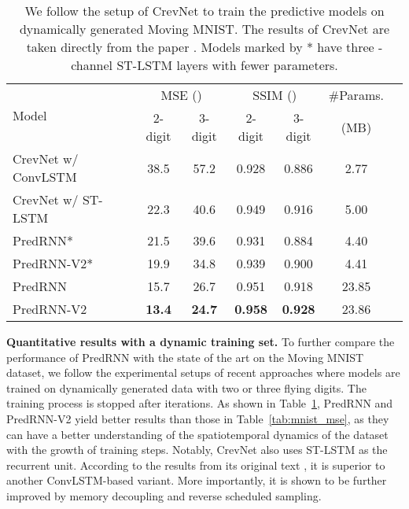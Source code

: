 \documentclass[10pt,journal,compsoc]{IEEEtran}
\newcommand{\tab}[1]{Table~\ref{#1}}
\newcommand{\myparagraph}[1]{\vspace{5pt} \noindent \textbf{#1.}}
\begin{document}
\begin{table}[t]
\vskip 0.05in
  \caption{We follow the setup of CrevNet to train the predictive models on dynamically generated Moving MNIST. The results of CrevNet are taken directly from the paper \cite{yu2020efficient}. Models marked by * have three -channel ST-LSTM layers with fewer parameters.
  }
  \vskip -0.05in
  \setlength{\tabcolsep}{4pt}
  \label{tab:mnist_fly}
  \centering
  \begin{tabular}{lcccccc}
    \toprule
    \multirow{2}{*}{Model} & \multicolumn{2}{c}{MSE ()} & \multicolumn{2}{c}{SSIM ()} & \#Params. \\
    & 2-digit & 3-digit & 2-digit & 3-digit & (MB) \\
    \midrule
    CrevNet w/ ConvLSTM & 38.5 & 57.2 & 0.928 & 0.886 & 2.77 \\
    CrevNet w/ ST-LSTM & 22.3 & 40.6 & 0.949 & 0.916 & 5.00 \\
    PredRNN* & 21.5 & 39.6 & 0.931 & 0.884 & 4.40\\
    PredRNN-V2* & 19.9 & 34.8 & 0.939 & 0.900 & 4.41\\
    PredRNN & 15.7 & 26.7 & 0.951 & 0.918 & 23.85 \\
    PredRNN-V2 & \textbf{13.4} & \textbf{24.7} & \textbf{0.958} & \textbf{0.928} & 23.86\\
    \bottomrule
  \end{tabular}
  \vspace{-10pt}
\end{table}


\myparagraph{Quantitative results with a dynamic training set}
To further compare the performance of PredRNN with the state of the art on the Moving MNIST dataset, we follow the experimental setups of recent approaches \cite{yu2020efficient,Kalchbrenner2016Video} where models are trained on dynamically generated data with two or three flying digits. 
The training process is stopped after  iterations.
As shown in \tab{tab:mnist_fly}, PredRNN and PredRNN-V2 yield better results than those in \tab{tab:mnist_mse}, as they can have a better understanding of the spatiotemporal dynamics of the dataset with the growth of training steps. 
Notably, CrevNet also uses ST-LSTM as the recurrent unit. According to the results from its original text \cite{yu2020efficient}, it is superior to another ConvLSTM-based variant. More importantly, it is shown to be further improved by memory decoupling and reverse scheduled sampling.
\end{document}
